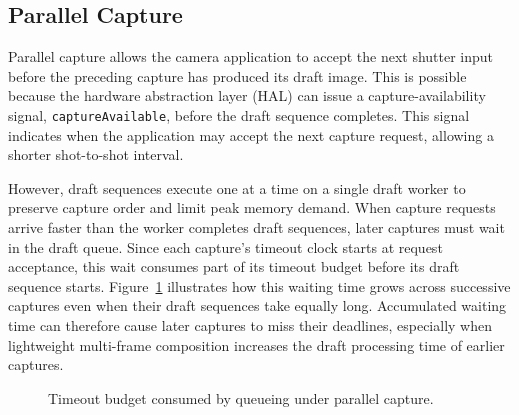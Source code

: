 \subsection{Parallel Capture}
\label{sec:parallel-capture}

Parallel capture allows the camera application to accept the next shutter input before the preceding capture has produced its draft image.
This is possible because the hardware abstraction layer (HAL) can issue a capture-availability signal, \texttt{captureAvailable}, before the draft sequence completes.
This signal indicates when the application may accept the next capture request, allowing a shorter shot-to-shot interval.

However, draft sequences execute one at a time on a single draft worker to preserve capture order and limit peak memory demand.
When capture requests arrive faster than the worker completes draft sequences, later captures must wait in the draft queue.
Since each capture's timeout clock starts at request acceptance, this wait consumes part of its timeout budget before its draft sequence starts.
Figure~\ref{fig:overlap} illustrates how this waiting time grows across successive captures even when their draft sequences take equally long.
Accumulated waiting time can therefore cause later captures to miss their deadlines, especially when lightweight multi-frame composition increases the draft processing time of earlier captures.

\begin{figure}[t]
  \centering
  \resizebox{\columnwidth}{!}{}
  \caption{Timeout budget consumed by queueing under parallel capture.}
  \label{fig:overlap}
\end{figure}
